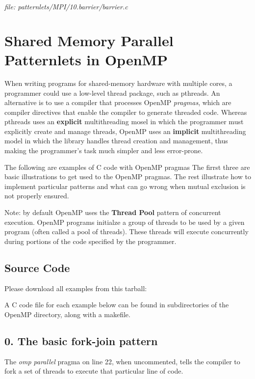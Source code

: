 \documentclass[letterpaper,10pt,openany,oneside]{sphinxmanual}
\begin{document}
\emph{file: patternlets/MPI/10.barrier/barrier.c}


\section{Shared Memory Parallel Patternlets in OpenMP}
\label{SharedMemory/OpenMP_Patternlets:shared-memory-parallel-patternlets-in-openmp}\label{SharedMemory/OpenMP_Patternlets::doc}
When writing programs for shared-memory hardware with multiple cores,
a programmer could use a
low-level thread package, such as pthreads. An alternative is to use
a compiler that processes OpenMP \emph{pragmas}, which are compiler directives that
enable the compiler to generate threaded code.  Whereas pthreads uses an \textbf{explicit}
multithreading mosel in which the programmer must explicitly create and manage threads,
OpenMP uses an \textbf{implicit} multithreading model in which the library handles
thread creation and management, thus making the programmer's task much simpler and
less error-prone.

The following are examples of C code with OpenMP pragmas
The firrst three are basic illustrations to get used to the OpenMP pragmas.
The rest illustrate how to implement particular patterns and what can
go wrong when mutual exclusion is not properly ensured.

Note: by default OpenMP uses the \textbf{Thread Pool} pattern of concurrent execution.
OpenMP programs initialze a group of threads to be used by a given program
(often called a pool of threads).  These threads will execute concurrently
during portions of the code specified by the programmer.


\subsection{Source Code}
\label{SharedMemory/OpenMP_Patternlets:source-code}
Please download all examples from this tarball:

A C code file for each example below can be found in subdirectories of the OpenMP directory,
along with a makefile.


\subsection{0. The basic fork-join pattern}
\label{SharedMemory/OpenMP_Patternlets:the-basic-fork-join-pattern}
The \emph{omp parallel} pragma on line 22, when uncommented, tells the compiler to
fork a set of threads to execute that particular line of code.
\end{document}
